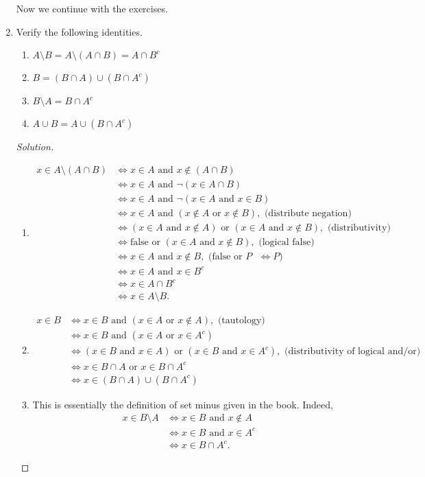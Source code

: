 \documentclass[12pt]{article}
\theoremstyle{definition}
\theoremstyle{plain}
\newenvironment{solution}
  {\begin{proof}[Solution]}
  {\end{proof}}
\newcommand{\Or}{\text{ or }}
\renewcommand{\And}{\text{ and }}
\begin{document}
\begin{enumerate}
Now we continue with the exercises.
\item Verify the following identities.
	\begin{enumerate}
	\item $ A \setminus B = A \setminus (A \cap B) = A \cap B^c $
	\item $ B = (B \cap A) \cup (B \cap A^c) $
	\item $ B \setminus A = B \cap A^c $
	\item $ A \cup B = A \cup (B \cap A^c) $
	\end{enumerate}
	\begin{solution}
	\begin{enumerate}
	\item \begin{align*}
		x \in A \setminus (A \cap B) & \iff x \in A \And x \notin (A \cap B)\\
		&\iff x \in A \And \neg (x \in A \cap B)\\
		&\iff x \in A \And \neg (x \in A \And x \in B)\\
		&\iff x \in A \And (x \notin A \Or x \notin B) , \text{ (distribute negation)}\\
		&\iff (x \in A \And x \notin A) \Or (x \in A \And x \notin B), \text{ (distributivity)}\\
		&\iff \text{false} \Or (x \in A \And x \notin B), \text{ (logical false)}\\
		&\iff x \in A \And x \notin B, \text{ (false or $P$ $\iff P$)} \\
		&\iff x \in A \And x \in B^c\\
		&\iff x \in A \cap B^c\\
		&\iff x \in A \setminus B.
	\end{align*}
	\item \begin{align*}
			x \in B & \iff x \in B \And (x \in A \Or x \notin A), \text{ (tautology)}\\
			&\iff x \in B \And (x \in A \Or x \in A^c)\\
			&\iff (x \in B \And x \in A) \Or (x \in B \And x \in A^c), \text{ (distributivity of logical and/or)}\\
			&\iff x \in B \cap A \Or x \in B \cap A^c\\
			&\iff x \in (B \cap A) \cup (B \cap A^c)
		\end{align*}
	\item This is essentially the definition of set minus given in the book. Indeed, 
		\begin{align*}
			x \in B \setminus A & \iff x \in B \And x \notin A\\
			& \iff x \in B \And x \in A^c\\
			& \iff x \in B \cap A^c.
		\end{align*}
		

\end{enumerate}
\end{solution}
\end{enumerate}
\end{document}
